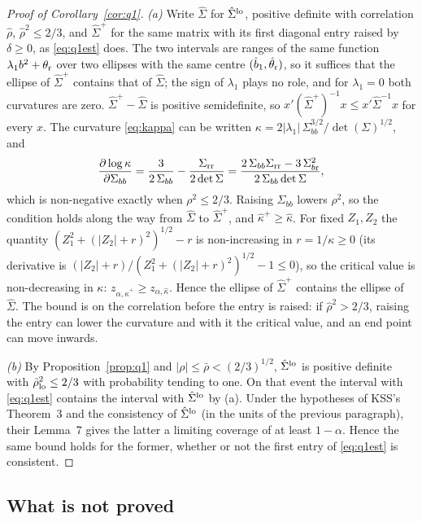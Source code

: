 \begin{proof}[Proof of Corollary~\ref{cor:q1}]
\emph{(a)} Write $\hat\Sigma$ for $\hat\Sigma^{\rm lo}$, positive definite with correlation $\hat\rho$,
$\hat\rho^2\le2/3$, and $\hat\Sigma^{+}$ for the same matrix with its first diagonal entry raised by
$\delta\ge0$, as \eqref{eq:q1est} does. The two intervals are ranges of the same function
$\lambda_1b^2+\theta_{\rm r}$ over two ellipses with the same centre $(\hat b_1,\hat\theta_{\rm r})$, so it suffices
that the ellipse of $\hat\Sigma^{+}$ contains that of $\hat\Sigma$; the sign of $\lambda_1$ plays no role, and for
$\lambda_1=0$ both curvatures are zero. $\hat\Sigma^{+}-\hat\Sigma$ is positive semidefinite, so
$x'(\hat\Sigma^{+})^{-1}x\le x'\hat\Sigma^{-1}x$ for every $x$. The curvature \eqref{eq:kappa} can be written
$\kappa=2|\lambda_1|\,\Sigma_{bb}^{3/2}/\det(\Sigma)^{1/2}$, and
\[
\frac{\partial\log\kappa}{\partial\Sigma_{bb}}=\frac{3}{2\,\Sigma_{bb}}-\frac{\Sigma_{\rm rr}}{2\det\Sigma}
=\frac{2\,\Sigma_{bb}\Sigma_{\rm rr}-3\,\Sigma_{b{\rm r}}^2}{2\,\Sigma_{bb}\det\Sigma},
\]
which is non-negative exactly when $\rho^2\le2/3$. Raising $\Sigma_{bb}$ lowers $\rho^2$, so the condition holds
along the way from $\hat\Sigma$ to $\hat\Sigma^{+}$, and $\hat\kappa^{+}\ge\hat\kappa$. For fixed $Z_1,Z_2$ the
quantity $(Z_1^2+(|Z_2|+r)^2)^{1/2}-r$ is non-increasing in $r=1/\kappa\ge0$ (its derivative is
$(|Z_2|+r)/(Z_1^2+(|Z_2|+r)^2)^{1/2}-1\le0$), so the critical value is non-decreasing in $\kappa$:
$z_{\alpha,\hat\kappa^{+}}\ge z_{\alpha,\hat\kappa}$. Hence the ellipse of $\hat\Sigma^{+}$ contains the ellipse of
$\hat\Sigma$. The bound is on the correlation before the entry is raised: if $\hat\rho^2>2/3$, raising the entry
can lower the curvature and with it the critical value, and an end point can move inwards.

\emph{(b)} By Proposition~\ref{prop:q1} and $|\rho|\le\bar\rho<(2/3)^{1/2}$, $\hat\Sigma^{\rm lo}$ is positive
definite with $\hat\rho_{\rm lo}^2\le2/3$ with probability tending to one. On that event the interval with
\eqref{eq:q1est} contains the interval with $\hat\Sigma^{\rm lo}$ by (a). Under the hypotheses of KSS's Theorem~3
and the consistency of $\hat\Sigma^{\rm lo}$ (in the units of the previous paragraph), their Lemma~7 gives the
latter a limiting coverage of at least $1-\alpha$. Hence the same bound holds for the former, whether or not
the first entry of \eqref{eq:q1est} is consistent.
\end{proof}

\subsection{What is not proved}

